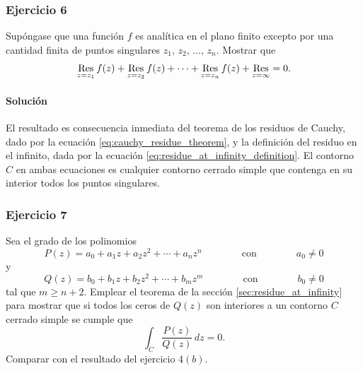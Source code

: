 \documentclass[a4paper]{report}
\def\Res{\qopname\relax m{Res}}
\begin{document}
\subsubsection*{Ejercicio 6}

Supóngase que una función \(f\) es analítica en el plano finito excepto por una cantidad finita de puntos singulares \(z_1,\,z_2,\,\dots,\,z_n\). Mostrar que 
\[
 \Res_{z=z_1}f(z)+\Res_{z=z_2}f(z)+\cdots+\Res_{z=z_n}f(z)+\Res_{z=\infty}=0.
\]

\paragraph{Solución} El resultado es consecuencia inmediata del teorema de los residuos de Cauchy, dado por la ecuación \ref{eq:cauchy_residue_theorem}, y la definición del residuo en el infinito, dada por la ecuación \ref{eq:residue_at_infinity_definition}. El contorno \(C\) en ambas ecuaciones es cualquier contorno cerrado simple que contenga en su interior todos los puntos singulares.

\subsubsection*{Ejercicio 7}

Sea el grado de los polinomios 
\[
 P(z)=a_0+a_1z+a_2z^2+\cdots+a_nz^n
 \qquad\qquad\textrm{con}\qquad\qquad
 a_0\neq0
\]
y
\[
 Q(z)=b_0+b_1z+b_2z^2+\cdots+b_mz^m
 \qquad\qquad\textrm{con}\qquad\qquad
 b_0\neq0
\]
tal que \(m\geq n+2\). Emplear el teorema de la sección \ref{sec:residue_at_infinity} para mostrar que si todos los ceros de \(Q(z)\) son interiores a un contorno \(C\) cerrado simple se cumple que 
\[
 \int_C\frac{P(z)}{Q(z)}\,dz=0.
\]
Comparar con el resultado del ejercicio 4\((b)\).
\end{document}
